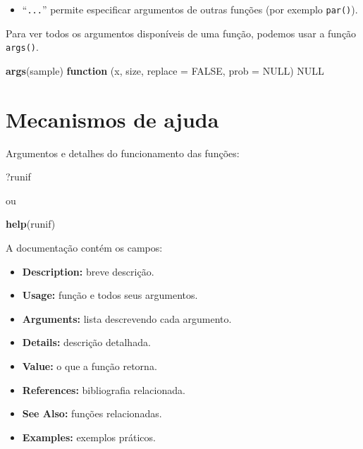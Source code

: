 \documentclass[10pt,a4paper]{book}
\newenvironment{Shaded}{\begin{snugshade}}{\end{snugshade}}
\newcommand{\KeywordTok}[1]{\textcolor[rgb]{0.13,0.29,0.53}{\textbf{#1}}}
\newcommand{\DataTypeTok}[1]{\textcolor[rgb]{0.13,0.29,0.53}{#1}}
\newcommand{\OtherTok}[1]{\textcolor[rgb]{0.56,0.35,0.01}{#1}}
\newcommand{\ControlFlowTok}[1]{\textcolor[rgb]{0.13,0.29,0.53}{\textbf{#1}}}
\newcommand{\NormalTok}[1]{#1}
\providecommand{\tightlist}{%
  \setlength{\itemsep}{0pt}\setlength{\parskip}{0pt}}
\begin{document}
\begin{itemize}
\tightlist
\item
  ``\texttt{...}'' permite especificar argumentos de outras funções (por
  exemplo \texttt{par()}).
\end{itemize}

Para ver todos os argumentos disponíveis de uma função, podemos usar a
função \texttt{args()}.

\begin{Shaded}
\begin{Highlighting}[]
\KeywordTok{args}\NormalTok{(sample)}
\ControlFlowTok{function}\NormalTok{ (x, size, }\DataTypeTok{replace =} \OtherTok{FALSE}\NormalTok{, }\DataTypeTok{prob =} \OtherTok{NULL}\NormalTok{) }
\OtherTok{NULL}
\end{Highlighting}
\end{Shaded}

\section{Mecanismos de ajuda}\label{mecanismos-de-ajuda}

Argumentos e detalhes do funcionamento das funções:

\begin{Shaded}
\begin{Highlighting}[]
\NormalTok{?runif}
\end{Highlighting}
\end{Shaded}

ou

\begin{Shaded}
\begin{Highlighting}[]
\KeywordTok{help}\NormalTok{(runif)}
\end{Highlighting}
\end{Shaded}

A documentação contém os campos:

\begin{itemize}
\tightlist
\item
  \textbf{Description:} breve descrição.
\item
  \textbf{Usage:} função e todos seus argumentos.
\item
  \textbf{Arguments:} lista descrevendo cada argumento.
\item
  \textbf{Details:} descrição detalhada.
\item
  \textbf{Value:} o que a função retorna.
\item
  \textbf{References:} bibliografia relacionada.
\item
  \textbf{See Also:} funções relacionadas.
\item
  \textbf{Examples:} exemplos práticos.
\end{itemize}
\end{document}
